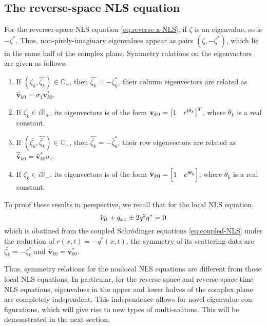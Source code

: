 \subsection{The reverse-space NLS equation}
\begin{theorem}
    For the reverser-space NLS equation \eqref{eq:reverse-x-NLS}, if $ \zeta $ is an eigenvalue, so is $ -\zeta^{*} $. Thus, non-pirely-imaginary eigenvalues appear as pairs $(\zeta, -\zeta^{*})$, which lie in the same half of the complex plane. Symmetry ralations on the eigenvactors are given as follows: 
    \begin{enumerate}
        \item If $ (\zeta_{k}, \hat{\zeta_{k}}) \in \mathbb{C_{+}}$, then $\hat{\zeta_{k}} = - \zeta^{*}_{k} $, their column eigenvectors are related as $\hat{\mathbf{v}}_{k0} = \sigma_{1} \mathbf{v}_{k0}^{*}$.
        \item If $ \zeta_{k} \in i\mathbb{R}_{+} $, its eigenvectors is of the form $\mathbf{v}_{k0} = \begin{bmatrix}1 & e^{\mathrm{i}\theta_{k}}\end{bmatrix}^{T} $, where $ \theta_{k} $ is a real constant.
        \item If $ (\bar{\zeta_{k}}, \hat{\bar{\zeta_{k}}}) \in \mathbb{C_{-}} $, then $\hat{\bar{\zeta_{k}}} = - \bar{\zeta}^{*}_{k} $, their row eigenvectors are related as $\hat{\bar{\mathbf{v}}}_{k0} = \bar{\mathbf{v}}_{k0}^{*} \sigma_{1}$.
        \item If $ \bar{\zeta_{k}} \in i\mathbb{R}_{-} $, its eigenvectors is of the form $\bar{\mathbf{v}}_{k0} = \begin{bmatrix}1 & e^{\mathrm{i}\bar{\theta}_{k}}\end{bmatrix} $, where $ \bar{\theta}_{k} $ is a real constant.
    \end{enumerate}
\end{theorem}
To proof these results in perspective, we recall that for the local NLS equation, 
\begin{equation}
    \mathrm{i} q_{t} + q_{xx} \pm 2 q^{2} q^{*} = 0 \label{eq:local-NLS}
\end{equation}
which is obatined from the coupled Schrödinger equations \eqref{eq:coupled-NLS} under the reduction of $ r(x,t) = -q^{*}(x,t) $, the symmetry of its scattering data are $ \bar{\zeta_{k}} = -\zeta^{*}_{k} $ and $\bar{\mathbf{v}}_{k0} = \mathbf{v}_{k0}^{*} $. 

Thus, symmetry relations for the nonlocal NLS equations are different from those local NLS equations.  In particular, for the reverse-space and reverse-space-time NLS equations, eigenvalues in the upper and lower halves of the complex plane are completely independent. This independence allows for novel eigenvalue con-figurations, which will give rise to new types of multi-solitons. This will be demonstrated in the next section. 

